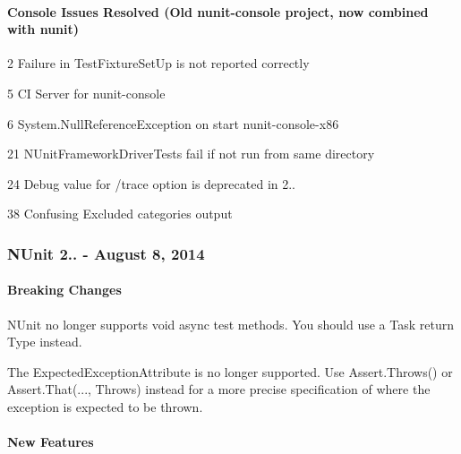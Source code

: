 \paragraph*{Console Issues Resolved (Old nunit-\/console project, now combined with nunit)}


\begin{DoxyItemize}
\item 2 Failure in Test\+Fixture\+Set\+Up is not reported correctly
\item 5 CI Server for nunit-\/console
\item 6 System.\+Null\+Reference\+Exception on start nunit-\/console-\/x86
\item 21 N\+Unit\+Framework\+Driver\+Tests fail if not run from same directory
\item 24 \textquotesingle{}Debug\textquotesingle{} value for /trace option is deprecated in 2..
\item 38 Confusing Excluded categories output
\end{DoxyItemize}

\subsubsection*{N\+Unit 2.. -\/ August 8, 2014}

\paragraph*{Breaking Changes}


\begin{DoxyItemize}
\item N\+Unit no longer supports void async test methods. You should use a Task return Type instead.
\item The Expected\+Exception\+Attribute is no longer supported. Use Assert.\+Throws() or Assert.\+That(..., Throws) instead for a more precise specification of where the exception is expected to be thrown.
\end{DoxyItemize}

\paragraph*{New Features}



